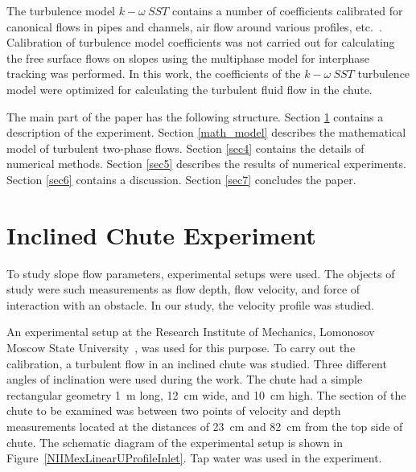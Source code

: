 \documentclass[mathematics,article,accept,pdftex,moreauthors]{Definitions/mdpi}
\begin{document}
The turbulence model $k-\omega\ SST$ contains a number of coefficients calibrated for canonical flows in pipes and channels, air flow around various profiles, etc.~\cite{LaunderSpalding1974, Tahry1983, LaunderMorseRodiSpaldiug1972}. Calibration of turbulence model coefficients was not carried out for calculating the free surface flows on slopes using the multiphase model for interphase tracking was performed. In this work, the coefficients of the $k-\omega\ SST$ turbulence model were optimized for calculating the turbulent fluid flow in the chute.

The main part of the paper has the following structure. 
Section \ref{sec2} contains a description of the experiment. Section \ref{math_model} describes the mathematical model of turbulent two-phase flows. Section \ref{sec4} contains the details of numerical methods. 
Section \ref{sec5} describes the results of numerical experiments. 
Section \ref{sec6} contains a discussion.
Section \ref{sec7} concludes the paper.


\section{Inclined Chute Experiment }\label{sec2}

To study slope flow parameters, experimental setups were used. The objects of study were such measurements as flow depth, flow velocity, and force of interaction with an obstacle. In our study, the velocity profile was studied.

An experimental setup at the Research Institute of Mechanics, Lomonosov Moscow State University~\cite{fluids7030111}, was used for this purpose. To carry out the calibration, a turbulent flow in an inclined chute was studied. Three different angles of inclination were used during the work. The chute had a simple rectangular geometry 1~m long, 12~cm wide, and 10~cm high. The section of the chute to be examined was between two points of velocity and depth measurements located at the distances of 23~cm and 82~cm from the top side of chute. The schematic diagram of the experimental setup is shown in Figure~\ref{NIIMexLinearUProfileInlet}. Tap water was used in the experiment.
\end{document}
